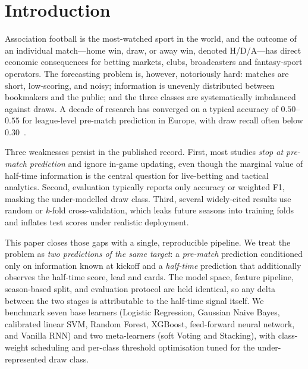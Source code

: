\documentclass[pdflatex,sn-mathphys-num]{sn-jnl}
\theoremstyle{thmstyleone}
\theoremstyle{thmstyletwo}
\theoremstyle{thmstylethree}
\begin{document}

\maketitle

\section{Introduction}\label{sec:intro}

Association football is the most-watched sport in the world, and the
outcome of an individual match---home win, draw, or away win, denoted
\textsc{H/D/A}---has direct economic consequences for betting markets,
clubs, broadcasters and fantasy-sport operators. The forecasting problem
is, however, notoriously hard: matches are short, low-scoring, and noisy;
information is unevenly distributed between bookmakers and the public;
and the three classes are systematically imbalanced against draws.
A decade of research has converged on a typical accuracy of
$0.50$--$0.55$ for league-level pre-match prediction in Europe, with
draw recall often below $0.30$~\cite{bib1,bib2}.

Three weaknesses persist in the published record. First, most studies
\emph{stop at pre-match prediction} and ignore in-game updating, even
though the marginal value of half-time information is the central
question for live-betting and tactical analytics. Second, evaluation
typically reports only accuracy or weighted F1, masking the under-modelled
draw class. Third, several widely-cited results use random or
\emph{k}-fold cross-validation, which leaks future seasons into training
folds and inflates test scores under realistic deployment.

This paper closes those gaps with a single, reproducible pipeline. We
treat the problem as \emph{two predictions of the same target}: a
\emph{pre-match} prediction conditioned only on information known at
kickoff and a \emph{half-time} prediction that additionally observes the
half-time score, lead and cards. The model space, feature pipeline,
season-based split, and evaluation protocol are held identical, so any
delta between the two stages is attributable to the half-time signal
itself. We benchmark seven base learners (Logistic Regression, Gaussian
Naive Bayes, calibrated linear SVM, Random Forest, XGBoost,
feed-forward neural network, and Vanilla RNN) and two meta-learners (soft Voting and
Stacking), with class-weight scheduling and per-class threshold
optimisation tuned for the under-represented draw class.
\end{document}
